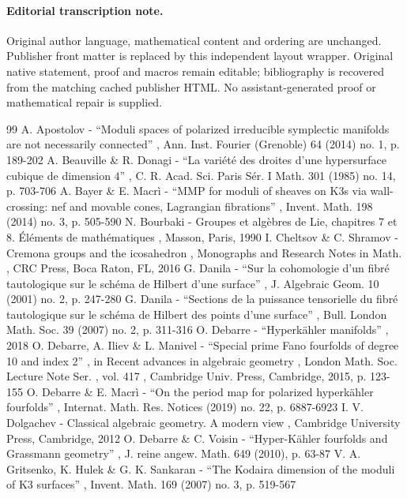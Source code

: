 \documentclass[11pt]{article}
\begin{document}
\paragraph{Editorial transcription note.}
Original author language, mathematical content and ordering are unchanged. Publisher front matter is replaced by this independent layout wrapper. Original native statement, proof and macros remain editable; bibliography is recovered from the matching cached publisher HTML. No assistant-generated proof or mathematical repair is supplied.
\clearpage

\begin{thebibliography}{99}
 A. Apostolov - “Moduli spaces of polarized irreducible symplectic manifolds are not necessarily connected” , Ann. Inst. Fourier (Grenoble) 64 (2014) no. 1, p. 189-202
 A. Beauville \& R. Donagi - “La variété des droites d’une hypersurface cubique de dimension $4$” , C. R. Acad. Sci. Paris Sér. I Math. 301 (1985) no. 14, p. 703-706
 A. Bayer \& E. Macrì - “MMP for moduli of sheaves on K3s via wall-crossing: nef and movable cones, Lagrangian fibrations” , Invent. Math. 198 (2014) no. 3, p. 505-590
 N. Bourbaki - Groupes et algèbres de Lie, chapitres 7 et 8. Éléments de mathématiques , Masson, Paris, 1990
 I. Cheltsov \& C. Shramov - Cremona groups and the icosahedron , Monographs and Research Notes in Math. , CRC Press, Boca Raton, FL, 2016
 G. Danila - “Sur la cohomologie d’un fibré tautologique sur le schéma de Hilbert d’une surface” , J. Algebraic Geom. 10 (2001) no. 2, p. 247-280
 G. Danila - “Sections de la puissance tensorielle du fibré tautologique sur le schéma de Hilbert des points d’une surface” , Bull. London Math. Soc. 39 (2007) no. 2, p. 311-316
 O. Debarre - “Hyperkähler manifolds” , 2018
 O. Debarre, A. Iliev \& L. Manivel - “Special prime Fano fourfolds of degree 10 and index 2” , in Recent advances in algebraic geometry , London Math. Soc. Lecture Note Ser. , vol. 417 , Cambridge Univ. Press, Cambridge, 2015, p. 123-155
 O. Debarre \& E. Macrì - “On the period map for polarized hyperkähler fourfolds” , Internat. Math. Res. Notices (2019) no. 22, p. 6887-6923
 I. V. Dolgachev - Classical algebraic geometry. A modern view , Cambridge University Press, Cambridge, 2012
 O. Debarre \& C. Voisin - “Hyper-Kähler fourfolds and Grassmann geometry” , J. reine angew. Math. 649 (2010), p. 63-87
 V. A. Gritsenko, K. Hulek \& G. K. Sankaran - “The Kodaira dimension of the moduli of K3 surfaces” , Invent. Math. 169 (2007) no. 3, p. 519-567

\end{thebibliography}
\end{document}
